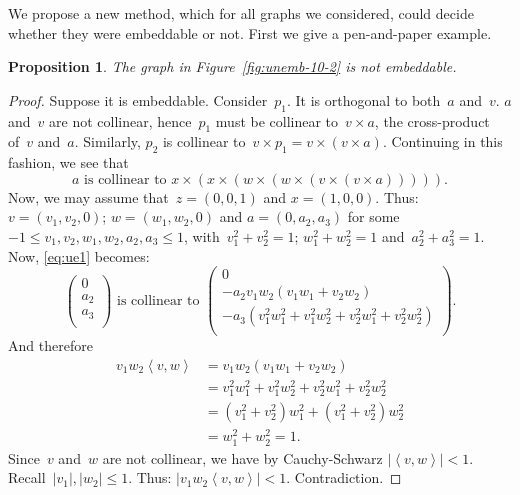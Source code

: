 \documentclass[adraft,copyright,creativecommons]{eptcs}
\newcounter{main}
\newtheorem{prop}[main]{Proposition}
\theoremstyle{definition}
\theoremstyle{remark}
\begin{document}
We propose a new method,
which for all graphs we considered,
could decide
whether they were embeddable or not.
First we give a pen-and-paper example.
\begin{prop}\label{prop:unemb-10-2}
The graph in Figure~\ref{fig:unemb-10-2}
is not embeddable.
\end{prop}
\begin{proof}
Suppose it is embeddable.
Consider~$p_1$.
It is orthogonal to both~$a$ and~$v$.
$a$ and~$v$ are not collinear,
hence~$p_1$ must be collinear to~$v \times a$,
the cross-product of~$v$ and~$a$.
Similarly, $p_2$ is collinear to~$v \times p_1 = v \times (v \times a)$.
Continuing in this fashion,
we see that
\begin{equation}\label{eq:ue1}
    a \text{ is collinear to }
    x \times (x \times( w \times (w\times (v \times (v \times a))))).
\end{equation}
Now, we may assume that~$z=(0,0,1)$ and $x=(1,0,0)$.
Thus: $v=(v_1,v_2,0)$;
$w = (w_1,w_2,0)$
and $a = (0, a_2,a_3)$ for some~$-1 \leq v_1,v_2,w_1,w_2,a_2,a_3 \leq 1$,
with~$v_1^2+v_2^2 = 1$; $w_1^2+w_2^2=1$ and~$a_2^2 + a_3^2=1$.
Now, \eqref{eq:ue1} becomes:
\begin{equation*}
\begin{pmatrix}
0\\
a_2\\
a_3\\
\end{pmatrix}
\text{ is collinear to }
\begin{pmatrix}
0\\
-a_2 v_1w_2 (v_1w_1 + v_2w_2) \\
-a_3 (v_1^2 w_1^2 + v_1^2 w_2^2 + v_2^2w_1^2 + v_2^2w_2^2)\\
\end{pmatrix}.
\end{equation*}
And therefore
\begin{align*}
v_1w_2 \left<v,w\right> & =
v_1w_2 (v_1w_1 + v_2w_2) \\
& = v_1^2 w_1^2 + v_1^2 w_2^2 + v_2^2w_1^2 + v_2^2w_2^2 \\
& = (v_1^2 + v_2^2)w_1^2 + (v_1^2 + v_2^2)w_2^2 \\
& = w_1^2 + w_2^2 = 1.
\end{align*}
Since~$v$ and~$w$ are not collinear,
we have by Cauchy-Schwarz $|\left<v,w\right>| < 1$.
Recall~$|v_1|, |w_2| \leq 1$.
Thus: $|v_1w_2\left<v,w\right>| < 1$.
Contradiction.
\end{proof}

\end{document}
